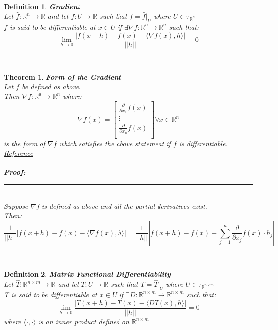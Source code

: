 \documentclass[12pt]{extarticle}
\theoremstyle{plain}
\newtheorem{thm}{Theorem}[section]
\theoremstyle{plain}
\theoremstyle{plain}
\theoremstyle{Definition}
\newtheorem{def.}{Definition}[section]
\theoremstyle{Definition}
\theoremstyle{plain}
\newcommand{\cut}[0]{\noindent\framebox[\linewidth]{\rule{\linewidth}{2pt}}\\}
\newcommand{\prof}[0]{	\noindent \textbf{Proof:} \rule{500pt}{2pt} \\ }
\begin{document}
\cut
\begin{def.} \textbf{Gradient} \\ 
	Let $\hat{f} : \mathbb{R}^n \to \mathbb{R}$ and let $f : U \to \mathbb{R}$ such that $f = \hat{f}|_U$ where $U \in \tau_{\mathbb{R}^n}$ \\ 
	$f$ is said to be differentiable at $x \in U$ if $\exists \nabla f : \mathbb{R}^n \to \mathbb{R}^n$ such that: \\  	
	$$\lim_{h \to 0}\frac{|f(x + h) - f(x) - \langle \nabla f(x),h \rangle|}{||h||} = 0$$ 
\end{def.} 
\cut
\begin{thm} \textbf{Form of the Gradient} \\ 
	Let $f$ be defined as above. \\ 
	Then $\nabla f: \mathbb{R}^n \to \mathbb{R}^n$ where: \\ 
	\[
	\nabla f(x) = 
	\begin{bmatrix}
	\frac{\partial }{\partial x_1}f(x) \\ 
	\vdots \\
	\frac{\partial }{\partial x_n}f(x) \\ 				
	\end{bmatrix}
	\forall x \in \mathbb{R}^n
	\]
	is the form of $\nabla f$ which satisfies the above statement if $f$ is differentiable. \\
	\href{https://en.wikipedia.org/wiki/Gradient}{Reference} \\ \\
	\prof 
	Suppose $\nabla f$ is defined as above and all the partial derivatives exist. \\ 
	Then: 
	$$\frac{1}{||h||} |f(x + h) - f(x) - \langle \nabla f(x),h \rangle| = \frac{1}{||h||} \left|f(x + h) - f(x) - \sum_{j=1}^n \frac{\partial}{\partial x_j} f(x)\cdot h_j\right|$$
\end{thm}
\cut
\newpage
\begin{def.} \textbf{Matrix Functional Differentiability} \\ 
	Let $\hat{T} : \mathbb{R}^{n \times m} \to \mathbb{R}$ and let $T : U \to \mathbb{R}$ such that $T = \hat{T}|_U$ where $U \in \tau_{\mathbb{R}^{n \times m}}$ \\ 
	T is said to be differentiable at $x \in U$ if $\exists D : \mathbb{R}^{n \times m} \to \mathbb{R}^{n \times m}$ such that: \\  
	$$\lim_{h \to 0}\frac{|T(x + h) - T(x) - \langle D T(x),h \rangle|}{||h||} = 0$$
	where $\langle \cdot, \cdot \rangle$ is an inner product defined on $\mathbb{R}^{n \times m}$
\end{def.}
\end{document}
